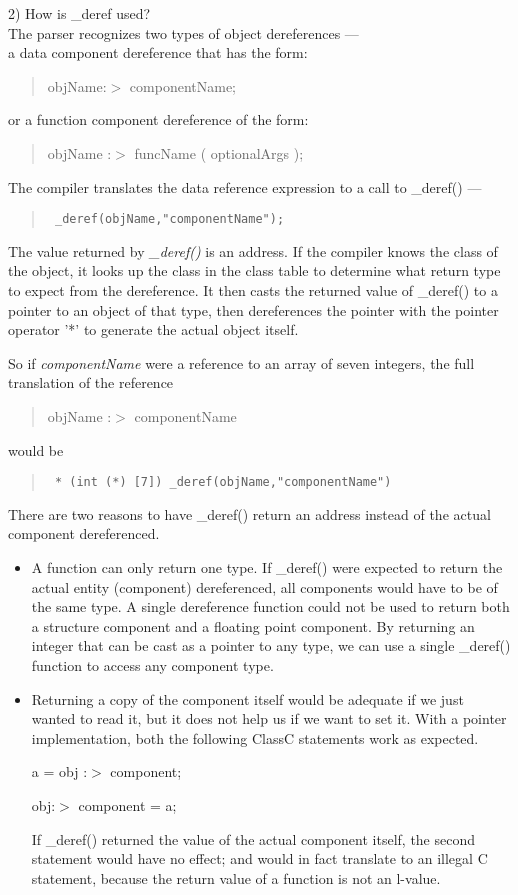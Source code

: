 2) How is \_deref used?\\
The parser recognizes two types of object dereferences ---\\
a data component dereference that has the form:
\begin{quote}
objName:$>$ componentName;
\end{quote}
or a function component dereference of the form:
\begin{quote} objName :$>$ funcName ( optionalArgs ); \end{quote}

The compiler translates the data reference expression to a call to \_deref() ---
\begin{quote} \tt
\_deref(objName,"componentName");
\end{quote}

The value returned by {\em \_deref()} is an address.
If the compiler knows the class of the object, it looks up the class in the
class table to determine what return type to expect from the dereference.
It then casts the returned value of \_deref() to a pointer to an object of
that type, then dereferences the pointer with the pointer operator '*'
to generate the actual object itself.

So if {\em componentName} were a reference to an array of seven integers,
the full translation of the reference
\begin{quote}
objName :$>$ componentName
\end{quote}
would be
\begin{quote} \tt
* (int (*) [7]) \_deref(objName,"componentName")
\end{quote}

There are two reasons to have \_deref() return an address instead of the actual
component dereferenced.
\begin{itemize}
\item A function can only return one type.  If \_deref() were expected to return
the actual entity  (component) dereferenced, all components would have
to be of the same type.  A single dereference function could not
be used to return both a structure component and a floating point component.
By returning an integer that can be cast as a pointer to any type, we
can use a single \_deref() function to access any component type.
\item Returning a copy of the component itself would be adequate if we just
wanted to read it, but it does not help us if we want to set it.  With a
pointer implementation, both the following ClassC statements work
as expected.

a = obj :$>$ component;

obj:$>$ component = a;

If \_deref() returned the value of the actual component itself, the second
statement would have no effect; and would in fact translate to an illegal
C statement, because the return value of a function is not an l-value.

\end{itemize}

